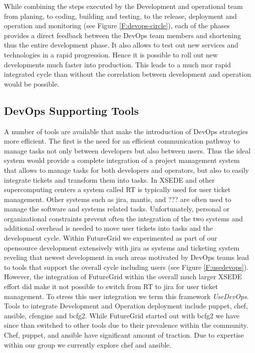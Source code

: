 While combining the steps executed by the Development and operational
team from planing, to coding, building and testing, to the release,
deployment and operation and monitoring (see Figure
\ref{F:devops-circle}), each of the phases provides a direct feedback
between the DevOps team members and shortening thus the entire
development phase. It also allows to test out new services and
technologies in a rapid progression. Hence it is possible to roll out
new developments much faster into production. This leads to a much mor
rapid integrated cycle than without the correlation between
development and operation would be possible.

\subsection{DevOps Supporting Tools}

A number of tools are available that make the introduction of DevOps
strategies more efficient. The first is the need for an efficient
communication pathway to manage tasks not only between developers but
also between users. Thus the ideal system would provide a complete
integration of a project management system that allows to manage tasks
for both developers and operators, but also to easily integrate
tickets and transform them into tasks. In XSEDE and other
supercomputing centers a system called RT is typically used for user
ticket management. Other systems such as jira, mantis, and ??? are
often used to manage the software and systems related
tasks. Unfortunately, personal or organizational constraints prevent
often the integration of the two systems and additional overhead is
needed to move user tickets into tasks and the development
cycle. Within FutureGrid we experimented as part of our opensource
development extensively with jira as systems and ticketing system
reveling that newest development in such areas motivated by DevOps
teams lead to tools that support the overall cycle including users
(see Figure \ref{F:usedevops}). However, the integration of
FutureGrid within the overall much larger XSEDE effort did make it not
possible to switch from RT to jira for user ticket
management. To stress this user integration we term this framework
{\em UseDevOps}. Tools to integrate Development and Operation
deployment include puppet, chef, ansible, cfengine and bcfg2. While
FutureGrid started out with bcfg2 we have since than switched to other
tools due to their prevalence within the community. Chef, puppet, and
ansible have significant amount of traction. Due to expertise within
our group we currently explore chef and ansible. 

